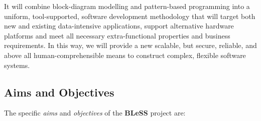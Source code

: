 \documentclass[a4paper,11pt]{article}
\newcommand{\project}[1]{\textbf{#1}\xspace}
\newcommand{\BLESS}{\project{BLeSS}}
\newcommand{\TheProject}{\BLESS}
\begin{document}
% 
It will combine block-diagram modelling and pattern-based programming into a uniform,
tool-supported, software development methodology that will target both new and existing data-intensive applications,
support alternative hardware platforms and meet all necessary extra-functional properties and business requirements.
In this way, we will provide a new scalable, but secure, reliable, and above all human-comprehensible means to construct
complex, flexible software systems.

\subsection{Aims and Objectives}
\label{sect:objectives}




%
The specific \emph{aims} and \emph{objectives} of the \TheProject{} project are:
\end{document}
